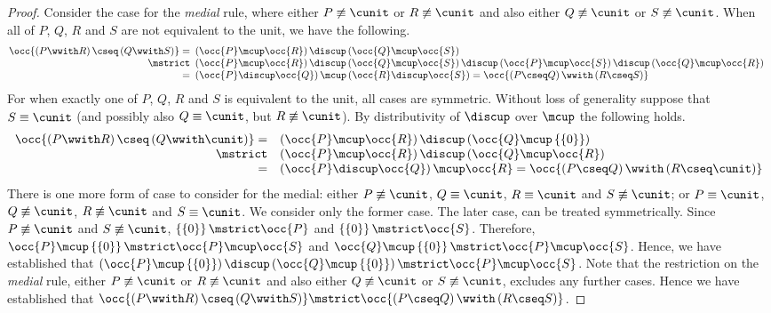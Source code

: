 \documentclass[UKenglish,acmsmall,authorversion]{acmart}
\theoremstyle{plain}
\begin{document}
\begin{proof}
Consider the case for the \textit{medial} rule, where either $P \not\equiv \cunit$ or $R \not\equiv \cunit$ and also either $Q \not\equiv \cunit$ or $S \not\equiv \cunit$.
When all of $P$, $Q$, $R$ and $S$ are not equivalent to the unit, we have the following.
\[
\begin{array}{rl}
\!\!\!
\occ{
 \left(P \wwith R\right) \cseq \left(Q \wwith S\right)
}
=&\!\!\!
\left( \occ{P} \mcup \occ{R} \right) \discup \left( \occ{Q} \mcup \occ{S} \right)
\\
\mstrict
&\!\!\!
\left( \occ{P} \mcup \occ{R} \right) \discup \left( \occ{Q} \mcup \occ{S} \right) \discup \left( \occ{P} \mcup \occ{S} \right) \discup \left( \occ{Q} \mcup \occ{R} \right)
\\
=
&\!\!\!
\left( \occ{P} \discup \occ{Q} \right) \mcup \left( \occ{R} \discup \occ{S} \right)
=
\occ{
 \left(P \cseq Q\right) \wwith \left(R \cseq S\right)
}
\end{array}
\]
For when exactly one of $P$, $Q$, $R$ and $S$ is equivalent to the unit, all cases are symmetric. Without loss of generality suppose that $S \equiv \cunit$ (and possibly also $Q \equiv \cunit$, but $R \not\equiv \cunit$). By distributivity of $\discup$ over $\mcup$ the following holds.
\[
\begin{array}{rl}
\occ{
 \left(P \wwith R\right) \cseq \left(Q \wwith \cunit\right)
}
=&
\left( \occ{P} \mcup \occ{R} \right) \discup \left( \occ{Q} \mcup \left\{\left\{ 0 \right\}\right\} \right)
\\
\mstrict&
\left( \occ{P} \mcup \occ{R} \right) \discup \left( \occ{Q} \mcup \occ{R} \right)
\\
=&
\left( \occ{P} \discup \occ{Q} \right) \mcup \occ{R}
=
\occ{
 \left(P \cseq Q\right) \wwith \left(R \cseq \cunit \right)
}
\end{array}
\]
There is one more form of case to consider for the medial: either $P \not\equiv \cunit$, $Q \equiv \cunit$, $R \equiv \cunit$ and $S \not\equiv \cunit$; or $P \equiv \cunit$, $Q \not\equiv \cunit$, $R \not\equiv \cunit$ and $S \equiv \cunit$. We consider only the former case. The later case, can be treated symmetrically.
Since $P \not\equiv \cunit$ and $S \not\equiv \cunit$, $\left\{\left\{ 0 \right\}\right\} \mstrict \occ{P}$ and $\left\{\left\{ 0 \right\}\right\} \mstrict \occ{S}$. Therefore, $\occ{P} \mcup \left\{\left\{ 0 \right\}\right\} \mstrict \occ{P} \mcup \occ{S}$ and $\occ{Q} \mcup \left\{\left\{ 0 \right\}\right\} \mstrict \occ{P} \mcup \occ{S}$. Hence, we have established that $\left(\occ{P} \mcup \left\{\left\{ 0 \right\}\right\}\right) \discup \left( \occ{Q} \mcup \left\{\left\{ 0 \right\}\right\} \right) \mstrict \occ{P} \mcup \occ{S}$.
%
Note that the restriction on the \textit{medial} rule, either $P \not\equiv \cunit$ or $R \not\equiv \cunit$ and also either $Q \not\equiv \cunit$ or $S \not\equiv \cunit$, excludes any further cases. Hence we have established that $
\occ{\left(P \wwith R\right) \cseq \left(Q \wwith S\right)}
\mstrict
\occ{\left(P \cseq Q\right) \wwith \left(R \cseq S\right)}$. %


\end{proof}
\end{document}
